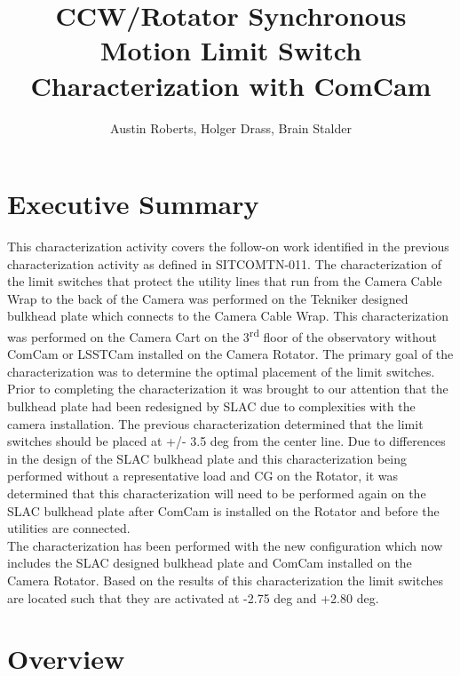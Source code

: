 \documentclass[SE,authoryear,toc, lsstdraft]{lsstdoc}
\title{CCW/Rotator Synchronous Motion Limit Switch Characterization with ComCam}
\author{%
Austin Roberts, Holger Drass, Brain Stalder
}
\date{\vcsDate}
\begin{document}
\maketitle


\section{Executive Summary}

This characterization activity covers the follow-on work identified in the previous characterization
activity as defined in SITCOMTN-011. The characterization of the limit switches that protect the
utility lines that run from the Camera Cable Wrap to the back of the Camera was performed on the
Tekniker designed bulkhead plate which connects to the Camera Cable Wrap. This characterization
was performed on the Camera Cart on the 3\textsuperscript{rd} floor of the observatory without ComCam or LSSTCam
installed on the Camera Rotator. The primary goal of the characterization was to determine the
optimal placement of the limit switches. Prior to completing the characterization it was brought
to our attention that the bulkhead plate had been redesigned by SLAC due to complexities with
the camera installation. The previous characterization determined that the limit switches should
be placed at +/- 3.5 deg from the center line. Due to differences in the design of the SLAC
bulkhead plate and this characterization being performed without a representative load and
CG on the Rotator, it was determined that this characterization will need to be performed
again on the SLAC bulkhead plate after ComCam is installed on the Rotator and before the
utilities are connected.\\
The characterization has been performed with the new configuration which now includes the
SLAC designed bulkhead plate and ComCam installed on the Camera Rotator. Based on the results
of this characterization the limit switches are located such that they are activated at -2.75 deg and +2.80 deg.


\section{Overview}
\end{document}
